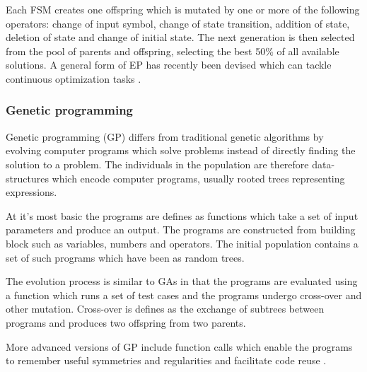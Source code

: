 Each FSM creates one offspring which is mutated by one or more of the following operators: change of input symbol, change of state transition, addition of state, deletion of state and change of initial state. The next generation is then selected from the pool of parents and offspring, selecting the best 50\% of all available solutions. A general form of EP has recently been devised which can tackle continuous optimization tasks \cite{Michalewicz1997}.

\subsubsection{Genetic programming}

Genetic programming (GP) differs from traditional genetic algorithms by evolving computer programs which solve problems instead of directly finding the solution to a problem. The individuals in the population are therefore data-structures which encode computer programs, usually rooted trees representing expressions.

At it's most basic the programs are defines as functions which take a set of input parameters and produce an output. The programs are constructed from building block such as variables, numbers and operators. The initial population contains a set of such programs which have been as random trees.

The evolution process is similar to GAs in that the programs are evaluated using a function which runs a set of test cases and the programs undergo cross-over and other mutation. Cross-over is defines as the exchange of subtrees between programs and produces two offspring from two parents.

More advanced versions of GP include function calls which enable the programs to remember useful symmetries and regularities and facilitate code reuse \cite{Michalewicz1997}.
